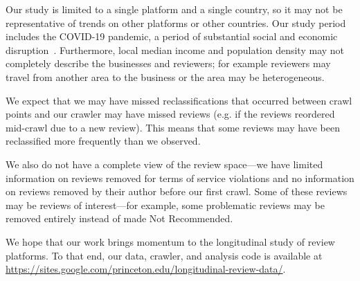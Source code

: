 Our study is limited to a single platform and a single country, so it may not be representative of trends on other platforms or other countries. Our study period includes the COVID-19 pandemic, a period of substantial social and economic disruption~\cite{altig2020economic,deb2020economic}. Furthermore, local median income and population density may not completely describe the businesses and reviewers; for example reviewers may travel from another area to the business or the area may be heterogeneous.

We expect that we may have missed reclassifications that occurred between crawl points and our crawler may have missed reviews (e.g. if the reviews reordered mid-crawl due to a new review). This means that some reviews may have been reclassified more frequently than we observed.

We also do not have a complete view of the review space---we have limited information on reviews removed for terms of service violations and no information on reviews removed by their author before our first crawl. Some of these reviews may be reviews of interest---for example, some problematic reviews may be removed entirely instead of made Not Recommended.

We hope that our work brings momentum to the longitudinal study of review platforms. To that end, our data, crawler, and analysis code is available at \url{https://sites.google.com/princeton.edu/longitudinal-review-data/}.